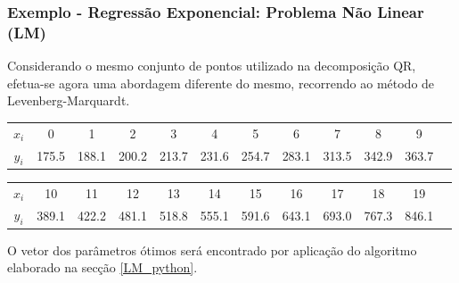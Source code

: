 \documentclass[]{article}
\numberwithin{equation}{subsection}
\begin{document}
\begin{Shaded}
\begin{Highlighting}[]
\OperatorTok{=}
\OperatorTok{=}
\OperatorTok{=}

\OperatorTok{=} \OperatorTok{+}\NormalTok{ s\_LM[}\NormalTok{]), }\OperatorTok{+}\NormalTok{ s\_LM[}\NormalTok{])}

\end{Highlighting}
\end{Shaded}

\newpage
\subsubsection{Exemplo - Regressão Exponencial: Problema Não Linear (LM)} \label{LM_exemplo}

Considerando o mesmo conjunto de pontos utilizado na decomposição QR,
efetua-se agora uma abordagem diferente do mesmo, recorrendo ao método
de Levenberg-Marquardt.

\begin{table}[h]
\centering
\begin{tabular}{c|ccccccccccc}
\hline
\textbf{\(x_i\)} & 0 & 1 & 2 & 3 & 4 & 5 & 6 & 7 & 8 & 9 \\
\textbf{\(y_i\)} & 175.5 & 188.1 & 200.2 & 213.7 & 231.6 & 254.7 & 283.1 & 313.5 & 342.9 & 363.7  \\
\hline
\end{tabular}
\end{table}

\begin{table}[h]
\centering
\begin{tabular}{c|ccccccccccc}
\hline
\textbf{\(x_i\)} & 10 & 11 & 12 & 13 & 14 & 15 & 16 & 17 & 18 & 19 \\
\textbf{\(y_i\)} & 389.1 & 422.2 & 481.1 & 518.8 & 555.1 & 591.6 & 643.1 & 693.0  & 767.3 & 846.1 \\
\hline
\end{tabular}
\end{table}

O vetor dos parâmetros ótimos será encontrado por aplicação do algoritmo
elaborado na secção \ref{LM_python}.
\end{document}
